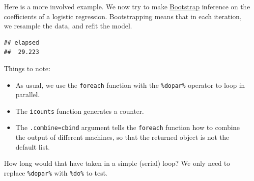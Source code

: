 \documentclass[]{book}
\newenvironment{Shaded}{\begin{snugshade}}{\end{snugshade}}
\newcommand{\KeywordTok}[1]{\textcolor[rgb]{0.13,0.29,0.53}{\textbf{#1}}}
\newcommand{\DataTypeTok}[1]{\textcolor[rgb]{0.13,0.29,0.53}{#1}}
\newcommand{\DecValTok}[1]{\textcolor[rgb]{0.00,0.00,0.81}{#1}}
\newcommand{\FloatTok}[1]{\textcolor[rgb]{0.00,0.00,0.81}{#1}}
\newcommand{\StringTok}[1]{\textcolor[rgb]{0.31,0.60,0.02}{#1}}
\newcommand{\OtherTok}[1]{\textcolor[rgb]{0.56,0.35,0.01}{#1}}
\newcommand{\OperatorTok}[1]{\textcolor[rgb]{0.81,0.36,0.00}{\textbf{#1}}}
\newcommand{\NormalTok}[1]{#1}
\providecommand{\tightlist}{%
  \setlength{\itemsep}{0pt}\setlength{\parskip}{0pt}}
\theoremstyle{definition}
\theoremstyle{definition}
\theoremstyle{definition}
\theoremstyle{remark}
\begin{document}
Here is a more involved example. We now try to make
\href{https://en.wikipedia.org/wiki/Bootstrapping_(statistics)}{Bootstrap}
inference on the coefficients of a logistic regression. Bootstrapping
means that in each iteration, we resample the data, and refit the model.

\begin{Shaded}
\end{Shaded}

\begin{verbatim}
## elapsed 
##  29.223
\end{verbatim}

Things to note:

\begin{itemize}
\tightlist
\item
  As usual, we use the \texttt{foreach} function with the
  \texttt{\%dopar\%} operator to loop in parallel.
\item
  The \texttt{icounts} function generates a counter.
\item
  The \texttt{.combine=cbind} argument tells the \texttt{foreach}
  function how to combine the output of different machines, so that the
  returned object is not the default list.
\end{itemize}

How long would that have taken in a simple (serial) loop? We only need
to replace \texttt{\%dopar\%} with \texttt{\%do\%} to test.
\end{document}
